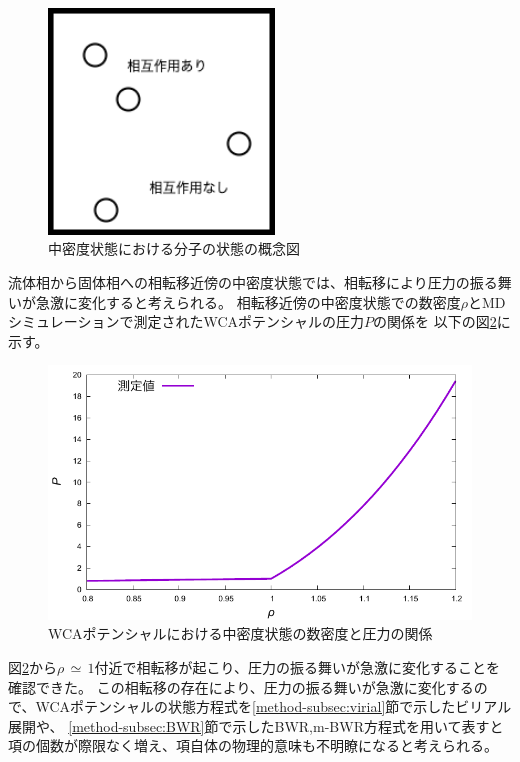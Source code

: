 \documentclass[titlepage]{jsreport}
\begin{document}
{{{\begin{figure}[htbp]
    \begin{center}
        \includegraphics[width=6cm]{fig/middledensity.png}
    \end{center}
    \caption{中密度状態における分子の状態の概念図}
    \label{fig:middledensity.png}
\end{figure}

\newpage
流体相から固体相への相転移近傍の中密度状態では、相転移により圧力の振る舞いが急激に変化すると考えられる。
相転移近傍の中密度状態での数密度$\rho$とMDシミュレーションで測定されたWCAポテンシャルの圧力$P$の関係を
以下の図\ref{fig:middleden_den-pre}に示す。

\begin{figure}[htbp]
    \begin{center}
        \includegraphics[width=14cm]{fig/middleden_den-pre.pdf}
    \end{center}
    \caption{WCAポテンシャルにおける中密度状態の数密度と圧力の関係}
    \label{fig:middleden_den-pre}
\end{figure}


図\ref{fig:middleden_den-pre}から$\rho\,{\simeq}\,1$付近で相転移が起こり、圧力の振る舞いが急激に変化することを確認できた。
この相転移の存在により、圧力の振る舞いが急激に変化するので、WCAポテンシャルの状態方程式を\ref{method-subsec:virial}節で示したビリアル展開や、
\ref{method-subsec:BWR}節で示したBWR,m-BWR方程式を用いて表すと項の個数が際限なく増え、項自体の物理的意味も不明瞭になると考えられる。


}}}
\end{document}
